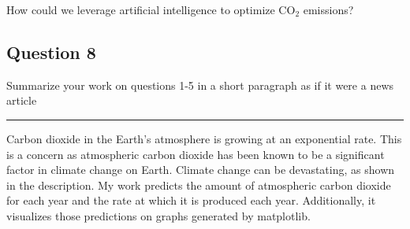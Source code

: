 \documentclass[11pt]{article}
\begin{document}
How could we leverage artificial intelligence to optimize CO\(_{\text{2}}\) emissions?

\subsection{Question 8}
\label{sec:org7100531}

Summarize your work on questions 1-5 in a short paragraph
as if it were a news article

\noindent\rule{\textwidth}{0.5pt}

Carbon dioxide in the Earth's atmosphere is growing at an exponential rate.
This is a concern as atmospheric carbon dioxide has been known to be a
significant factor in climate change on Earth.
Climate change can be devastating, as shown in the description.
My work predicts the amount of atmospheric carbon dioxide for each
year and the rate at which it is produced each year.
Additionally, it visualizes those predictions on graphs generated
by matplotlib.
\end{document}
